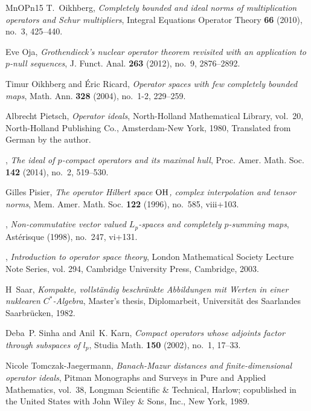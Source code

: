 \documentclass[11pt]{amsart}
\numberwithin{equation}{section}
\begin{document}
\begin{thebibliography}{MnOPn15}
T.~Oikhberg, \emph{Completely bounded and ideal norms of multiplication
  operators and {S}chur multipliers}, Integral Equations Operator Theory
  \textbf{66} (2010), no.~3, 425--440. 

Eve Oja, \emph{Grothendieck's nuclear operator theorem revisited with an
  application to {$p$}-null sequences}, J. Funct. Anal. \textbf{263} (2012),
  no.~9, 2876--2892. 

Timur Oikhberg and \'{E}ric Ricard, \emph{Operator spaces with few completely
  bounded maps}, Math. Ann. \textbf{328} (2004), no.~1-2, 229--259.

Albrecht Pietsch, \emph{Operator ideals}, North-Holland Mathematical Library,
  vol.~20, North-Holland Publishing Co., Amsterdam-New York, 1980, Translated
  from German by the author. 

\bysame, \emph{The ideal of {$p$}-compact operators and its maximal hull},
  Proc. Amer. Math. Soc. \textbf{142} (2014), no.~2, 519--530. 

Gilles Pisier, \emph{The operator {H}ilbert space {${\rm OH}$}, complex
  interpolation and tensor norms}, Mem. Amer. Math. Soc. \textbf{122} (1996),
  no.~585, viii+103. 

\bysame, \emph{Non-commutative vector valued {$L_p$}-spaces and completely
  {$p$}-summing maps}, Ast\'{e}risque (1998), no.~247, vi+131. 

\bysame, \emph{Introduction to operator space theory}, London Mathematical
  Society Lecture Note Series, vol. 294, Cambridge University Press, Cambridge,
  2003. 

H~Saar, \emph{Kompakte, vollst{\"a}ndig beschr{\"a}nkte {A}bbildungen mit
  {W}erten in einer nuklearen ${C}^*$-{A}lgebra}, Master's thesis,
  Diplomarbeit, Universit{\"a}t des Saarlandes Saarbr{\"u}cken, 1982.

Deba~P. Sinha and Anil~K. Karn, \emph{Compact operators whose adjoints factor
  through subspaces of {$l_p$}}, Studia Math. \textbf{150} (2002), no.~1,
  17--33. 

Nicole Tomczak-Jaegermann, \emph{Banach-{M}azur distances and
  finite-dimensional operator ideals}, Pitman Monographs and Surveys in Pure
  and Applied Mathematics, vol.~38, Longman Scientific \& Technical, Harlow;
  copublished in the United States with John Wiley \& Sons, Inc., New York,
  1989. 


\end{thebibliography}
\end{document}
